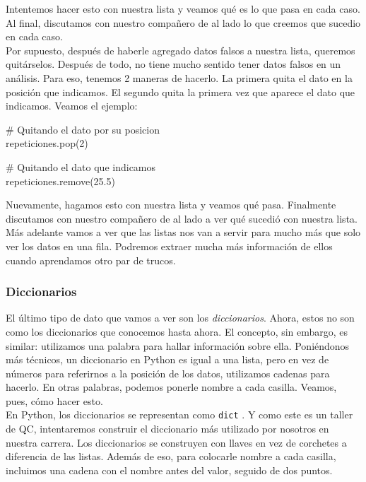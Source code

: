 \documentclass[10pt,letterpaper]{article}
\newcommand{\inlinecode}[1]{
\colorbox{light-gray}{\texttt{#1}}
}
\newenvironment{Code}
{
\begin{lrbox}{\selvestebox}%
\begin{minipage}{\dimexpr\columnwidth-2\fboxsep\relax}
\fontfamily{\ttdefault}\selectfont
}
{\end{minipage}\end{lrbox}%
\begin{center}
\colorbox{light-gray}{\usebox{\selvestebox}}
\end{center}
}
\begin{document}
Intentemos hacer esto con nuestra lista y veamos qu\'e es lo que pasa en cada caso. Al final, discutamos con nuestro compa\~nero de al lado lo que creemos que sucedio en cada caso.\\

Por supuesto, despu\'es de haberle agregado datos falsos a nuestra lista, queremos quit\'arselos. Despu\'es de todo, no tiene mucho sentido tener datos falsos en un an\'alisis. Para eso, tenemos 2 maneras de hacerlo. La primera quita el dato en la posici\'on que indicamos. El segundo quita la primera vez que aparece el dato que indicamos. Veamos el ejemplo:

\begin{Code}
\# Quitando el dato por su posicion\\
repeticiones.pop(2)

\# Quitando el dato que indicamos\\
repeticiones.remove(25.5)
\end{Code}

Nuevamente, hagamos esto con nuestra lista y veamos qu\'e pasa. Finalmente discutamos con nuestro compa\~nero de al lado a ver qu\'e sucedi\'o con nuestra lista.\\

M\'as adelante vamos a ver que las listas nos van a servir para mucho m\'as que solo ver los datos en una fila. Podremos extraer mucha m\'as informaci\'on de ellos cuando aprendamos otro par de trucos.

\subsubsection{Diccionarios}
El \'ultimo tipo de dato que vamos a ver son los \emph{diccionarios}. Ahora, estos no son como los diccionarios que conocemos hasta ahora. El concepto, sin embargo, es similar: utilizamos una palabra para hallar informaci\'on sobre ella. Poni\'endonos m\'as t\'ecnicos, un diccionario en Python es igual a una lista, pero en vez de n\'umeros para referirnos a la posici\'on de los datos, utilizamos cadenas para hacerlo. En otras palabras, podemos ponerle nombre a cada casilla. Veamos, pues, c\'omo hacer esto.\\

En Python, los diccionarios se representan como \inlinecode{dict}. Y como este es un taller de QC, intentaremos construir el diccionario m\'as utilizado por nosotros en nuestra carrera. Los diccionarios se construyen con llaves en vez de corchetes a diferencia de las listas. Adem\'as de eso, para colocarle nombre a cada casilla, incluimos una cadena con el nombre antes del valor, seguido de dos puntos.
\end{document}
